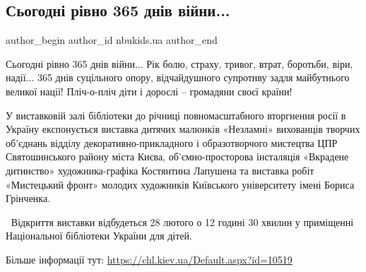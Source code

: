  
 
 
 
 

\subsection{Сьогодні рівно 365 днів війни...}
\label{sec:24_02_2023.fb.nbukids.ua.1.sogodn__r_vno_365_dn}

\ifcmt
 author_begin
   author_id nbukids.ua
 author_end
\fi

Сьогодні рівно 365 днів війни... Рік болю, страху, тривог, втрат, боротьби, віри,
надії... 365 днів суцільного опору, відчайдушного супротиву задля майбутнього
великої нації! Пліч-о-пліч діти і дорослі – громадяни своєї країни!

У виставковій залі бібліотеки до річниці повномасштабного вторгнення росії в
Україну експонується виставка дитячих малюнків «Незламні» вихованців творчих
об'єднань відділу декоративно-прикладного і образотворчого мистецтва ЦПР
Святошинського району міста Києва, об'ємно-просторова інсталяція «Вкрадене
дитинство» художника-графіка Костянтина Лапушена та виставка робіт «Мистецький
фронт» молодих художників  Київського університету імені Бориса Грінченка.

💛💙Відкриття виставки відбудеться 28 лютого о 12 годині 30 хвилин у приміщенні
Національної бібліотеки України для дітей.

Більше інформації тут: \url{https://chl.kiev.ua/Default.aspx?id=10519}
